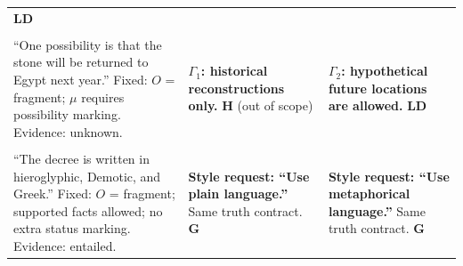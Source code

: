\begin{tabularx}{\linewidth}{@{}P{.35\linewidth}YY@{}}
{\color{clrLD}\textbf{LD}}\\\addlinespace[5pt]\midrule
{}\\[2pt]
``One possibility is that the stone will be returned to Egypt next year.''\newline
{\footnotesize Fixed: $O$ = fragment; $\mu$ requires possibility marking. Evidence: unknown.} &
{\color{clrB}\textbf{$\Gamma_1$: historical reconstructions only.}}\newline
{\color{clrH}\textbf{H}} (out of scope) &
{\color{clrB}\textbf{$\Gamma_2$: hypothetical future locations are allowed.}}\newline
{\color{clrLD}\textbf{LD}}\\\addlinespace[5pt]\midrule
{}\\[2pt]
``The decree is written in hieroglyphic, Demotic, and Greek.''\newline
{\footnotesize Fixed: $O$ = fragment; supported facts allowed; no extra status marking. Evidence: entailed.} &
{\color{clrB}\textbf{Style request: ``Use plain language.''}}\newline
Same truth contract.\newline
\textbf{G} &
{\color{clrB}\textbf{Style request: ``Use metaphorical language.''}}\newline
Same truth contract.\newline
\textbf{G}\\
\bottomrule
\end{tabularx}
\endgroup
